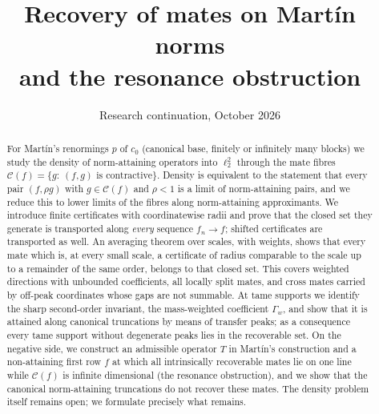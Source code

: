 \documentclass[10pt]{amsart}
\title{Recovery of mates on Mart\'in norms\\and the resonance obstruction}
\author{}
\date{Research continuation, October 2026}
\theoremstyle{definition}
\theoremstyle{remark}
\newcommand{\Cset}{\mathcal C}
\begin{document}
\begin{abstract}
For Mart\'in's renormings $p$ of $c_0$ (canonical base, finitely or
infinitely many blocks) we study the density of norm-attaining operators
into $\ell_2^2$ through the mate fibres
$\Cset(f)=\{g:\ (f,g)\text{ is contractive}\}$.  Density is equivalent to the
statement that every pair $(f,\rho g)$ with $g\in\Cset(f)$ and $\rho<1$ is a
limit of norm-attaining pairs, and we reduce this to lower limits of the
fibres along norm-attaining approximants.  We introduce finite
certificates with coordinatewise radii and prove that the closed set they
generate is transported along \emph{every} sequence $f_n\to f$; shifted
certificates are transported as well.  An averaging theorem over scales,
with weights, shows that every mate which is, at every small scale, a
certificate of radius comparable to the scale up to a remainder of the same
order, belongs to that closed set.  This covers weighted directions with
unbounded coefficients, all locally split mates, and cross mates carried by
off-peak coordinates whose gaps are not summable.  At tame supports we
identify the sharp second-order invariant, the mass-weighted coefficient
$\Gamma_w$, and show that it is attained along canonical truncations by
means of transfer peaks; as a consequence every tame support without
degenerate peaks lies in the recoverable set.  On the negative side, we
construct an admissible operator $T$ in Mart\'in's construction and a
non-attaining first row $f$ at which all intrinsically recoverable mates
lie on one line while $\Cset(f)$ is infinite dimensional (the resonance
obstruction), and we show that the canonical norm-attaining truncations do
not recover these mates.  The density problem itself remains open; we
formulate precisely what remains.
\end{abstract}
\maketitle
\tableofcontents
\end{document}
